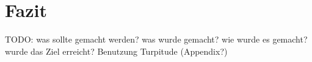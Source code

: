 
\section{Fazit}
\label{sec:chap1:fazit}

TODO:
was sollte gemacht werden? was wurde gemacht? wie wurde es gemacht?
wurde das Ziel erreicht?
Benutzung Turpitude (Appendix?)




